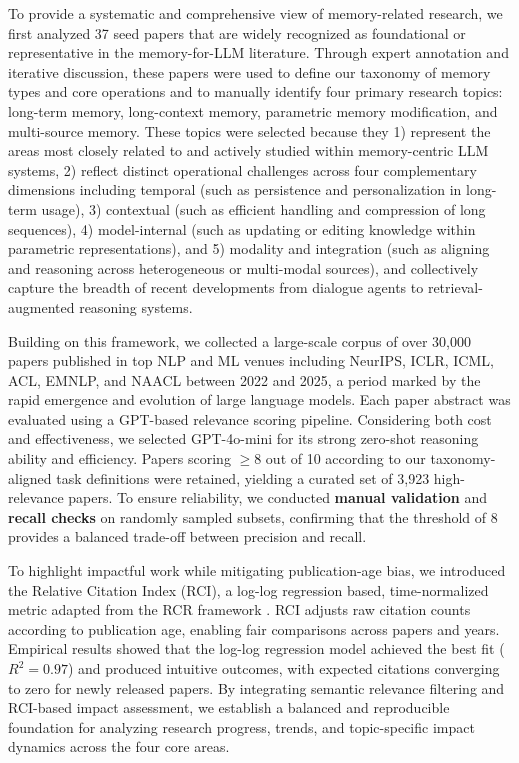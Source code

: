 \documentclass[manuscript,screen]{acmart}
\begin{document}
To provide a systematic and comprehensive view of memory-related research, we first analyzed 37 seed papers that are widely recognized as foundational or representative in the memory-for-LLM literature. Through expert annotation and iterative discussion, these papers were used to define our taxonomy of memory types and core operations and to manually identify four primary research topics: long-term memory, long-context memory, parametric memory modification, and multi-source memory. These topics were selected because they 1) represent the areas most closely related to and actively studied within memory-centric LLM systems, 2) reflect distinct operational challenges across four complementary dimensions including temporal (such as persistence and personalization in long-term usage), 3) contextual (such as efficient handling and compression of long sequences), 4) model-internal (such as updating or editing knowledge within parametric representations), and 5) modality and integration (such as aligning and reasoning across heterogeneous or multi-modal sources), and collectively capture the breadth of recent developments from dialogue agents to retrieval-augmented reasoning systems.

Building on this framework, we collected a large-scale corpus of over 30,000 papers published in top NLP and ML venues including NeurIPS, ICLR, ICML, ACL, EMNLP, and NAACL between 2022 and 2025, a period marked by the rapid emergence and evolution of large language models. Each paper abstract was evaluated using a GPT-based relevance scoring pipeline. Considering both cost and effectiveness, we selected GPT-4o-mini for its strong zero-shot reasoning ability and efficiency. Papers scoring $\geq 8$ out of 10 according to our taxonomy-aligned task definitions were retained, yielding a curated set of 3,923 high-relevance papers. To ensure reliability, we conducted \textbf{manual validation} and \textbf{recall checks} on randomly sampled subsets, confirming that the threshold of 8 provides a balanced trade-off between precision and recall.

To highlight impactful work while mitigating publication-age bias, we introduced the Relative Citation Index (RCI), a log-log regression based, time-normalized metric adapted from the RCR framework \citep{10.1371/journal.pbio.1002541}. RCI adjusts raw citation counts according to publication age, enabling fair comparisons across papers and years. Empirical results showed that the log-log regression model achieved the best fit ($R^2=0.97$) and produced intuitive outcomes, with expected citations converging to zero for newly released papers. By integrating semantic relevance filtering and RCI-based impact assessment, we establish a balanced and reproducible foundation for analyzing research progress, trends, and topic-specific impact dynamics across the four core areas.
\end{document}
